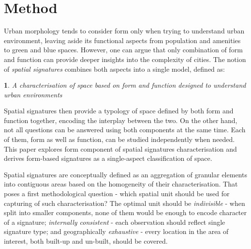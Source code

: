 \section{Method}
\label{sec:meth}

Urban morphology tends to consider form only when trying to understand urban
environment, leaving aside its functional aspects from population and amenities to green
and blue spaces. However, one can argue that only combination of form and function can
provide deeper insights into the complexity of cities. The notion of \textit{spatial
signatures} combines both aspects into a single model, defined as:

\newtheorem*{theorem}{}
\begin{theorem}
    A characterisation of space based on form and function designed to understand urban
environments
\end{theorem}

Spatial signatures then provide a typology of space defined by both form and function
together, encoding the interplay between the two. On the other hand, not all questions
can be answered using both components at the same time. Each of them, form as well as
function, can be studied independently when needed. This paper explores form component
of spatial signatures characterisation and derives form-based signatures as a
single-aspect classification of space.

Spatial signatures are conceptually defined as an aggregation of granular elements into
contiguous areas based on the homogeneity of their characterisation. That poses a first
methodological question - which spatial unit should be used for capturing of such
characterisation? The optimal unit should be \textit{indivisible} - when split into
smaller components, none of them would be enough to encode character of a signature;
\textit{internally consistent} - each observation should reflect single signature type;
and geographically \textit{exhaustive} - every location in the area of interest, both
built-up and un-built, should be covered.


